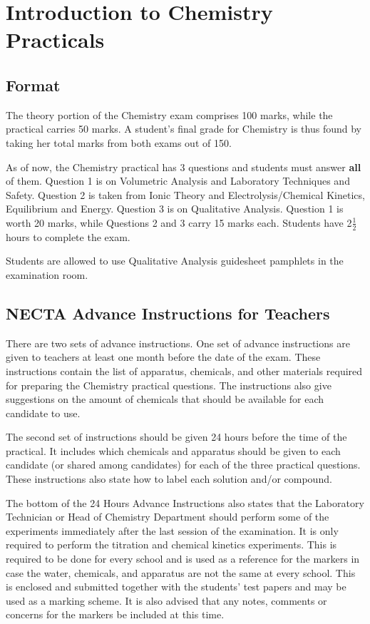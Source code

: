 \section{Introduction to Chemistry Practicals} \label{chem-practical-format}

\subsection{Format}
The theory portion of the Chemistry exam comprises 100 marks, while the practical carries 50 marks. A student's final grade for Chemistry is thus found by taking her total marks from both exams out of 150.

As of now, the Chemistry practical has 3 questions and students must answer \textbf{all} of them. Question 1 is on Volumetric Analysis and Laboratory Techniques and Safety. Question 2 is taken from Ionic Theory and Electrolysis\slash Chemical Kinetics, Equilibrium and Energy. Question 3 is on Qualitative Analysis. Question 1 is worth 20 marks, while Questions 2 and 3 carry 15 marks each. Students have 2$\frac{1}{2}$ hours to complete the exam.

Students are allowed to use Qualitative Analysis guidesheet pamphlets in the examination room.

\subsection{NECTA Advance Instructions for Teachers}
There are two sets of advance instructions. One set of advance instructions are given to teachers at least one month before the date of the exam. These instructions contain the list of apparatus, chemicals, and other materials required for preparing the Chemistry practical questions. The instructions also give suggestions on the amount of chemicals that should be available for each candidate to use.

The second set of instructions should be given 24 hours before the time of the practical. It includes which chemicals and apparatus should be given to each candidate (or shared among candidates) for each of the three practical questions. These instructions also state how to label each solution and/or compound.

The bottom of the 24 Hours Advance Instructions also states that the Laboratory Technician or Head of Chemistry Department should perform some of the experiments immediately after the last session of the examination. It is only required to perform the titration and chemical kinetics experiments. This is required to be done for every school and is used as a reference for the markers in case the water, chemicals, and apparatus are not the same at every school. This is enclosed and submitted together with the students' test papers and may be used as a marking scheme. It is also advised that any notes, comments or concerns for the markers be included at this time.

